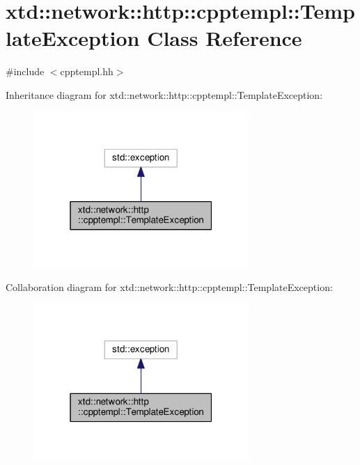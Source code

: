 \hypertarget{classxtd_1_1network_1_1http_1_1cpptempl_1_1TemplateException}{\section{xtd\-:\-:network\-:\-:http\-:\-:cpptempl\-:\-:Template\-Exception Class Reference}
\label{classxtd_1_1network_1_1http_1_1cpptempl_1_1TemplateException}
}


{\ttfamily \#include $<$cpptempl.\-hh$>$}



Inheritance diagram for xtd\-:\-:network\-:\-:http\-:\-:cpptempl\-:\-:Template\-Exception\-:
\nopagebreak
\begin{figure}[H]
\begin{center}
\leavevmode
\includegraphics[width=232pt]{classxtd_1_1network_1_1http_1_1cpptempl_1_1TemplateException__inherit__graph}
\end{center}
\end{figure}


Collaboration diagram for xtd\-:\-:network\-:\-:http\-:\-:cpptempl\-:\-:Template\-Exception\-:
\nopagebreak
\begin{figure}[H]
\begin{center}
\leavevmode
\includegraphics[width=232pt]{classxtd_1_1network_1_1http_1_1cpptempl_1_1TemplateException__coll__graph}
\end{center}
\end{figure}
